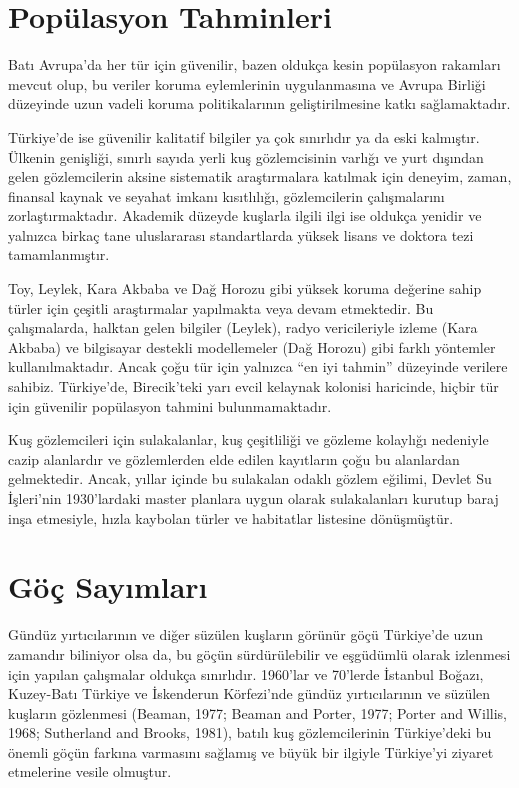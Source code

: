 \documentclass[
  a4paper,
  DIV=11,
  numbers=noendperiod]{scrartcl}
\begin{document}
\section*{Popülasyon Tahminleri}\label{popuxfclasyon-tahminleri}


Batı Avrupa'da her tür için güvenilir, bazen oldukça kesin popülasyon
rakamları mevcut olup, bu veriler koruma eylemlerinin uygulanmasına ve
Avrupa Birliği düzeyinde uzun vadeli koruma politikalarının
geliştirilmesine katkı sağlamaktadır.

Türkiye'de ise güvenilir kalitatif bilgiler ya çok sınırlıdır ya da eski
kalmıştır. Ülkenin genişliği, sınırlı sayıda yerli kuş gözlemcisinin
varlığı ve yurt dışından gelen gözlemcilerin aksine sistematik
araştırmalara katılmak için deneyim, zaman, finansal kaynak ve seyahat
imkanı kısıtlılığı, gözlemcilerin çalışmalarını zorlaştırmaktadır.
Akademik düzeyde kuşlarla ilgili ilgi ise oldukça yenidir ve yalnızca
birkaç tane uluslararası standartlarda yüksek lisans ve doktora tezi
tamamlanmıştır.

Toy, Leylek, Kara Akbaba ve Dağ Horozu gibi yüksek koruma değerine sahip
türler için çeşitli araştırmalar yapılmakta veya devam etmektedir. Bu
çalışmalarda, halktan gelen bilgiler (Leylek), radyo vericileriyle
izleme (Kara Akbaba) ve bilgisayar destekli modellemeler (Dağ Horozu)
gibi farklı yöntemler kullanılmaktadır. Ancak çoğu tür için yalnızca
``en iyi tahmin'' düzeyinde verilere sahibiz. Türkiye'de, Birecik'teki
yarı evcil kelaynak kolonisi haricinde, hiçbir tür için güvenilir
popülasyon tahmini bulunmamaktadır.

Kuş gözlemcileri için sulakalanlar, kuş çeşitliliği ve gözleme kolaylığı
nedeniyle cazip alanlardır ve gözlemlerden elde edilen kayıtların çoğu
bu alanlardan gelmektedir. Ancak, yıllar içinde bu sulakalan odaklı
gözlem eğilimi, Devlet Su İşleri'nin 1930'lardaki master planlara uygun
olarak sulakalanları kurutup baraj inşa etmesiyle, hızla kaybolan türler
ve habitatlar listesine dönüşmüştür.

\section*{Göç Sayımları}\label{guxf6uxe7-sayux131mlarux131}


Gündüz yırtıcılarının ve diğer süzülen kuşların görünür göçü Türkiye'de
uzun zamandır biliniyor olsa da, bu göçün sürdürülebilir ve eşgüdümlü
olarak izlenmesi için yapılan çalışmalar oldukça sınırlıdır. 1960'lar ve
70'lerde İstanbul Boğazı, Kuzey-Batı Türkiye ve İskenderun Körfezi'nde
gündüz yırtıcılarının ve süzülen kuşların gözlenmesi (Beaman, 1977;
Beaman and Porter, 1977; Porter and Willis, 1968; Sutherland and Brooks,
1981), batılı kuş gözlemcilerinin Türkiye'deki bu önemli göçün farkına
varmasını sağlamış ve büyük bir ilgiyle Türkiye'yi ziyaret etmelerine
vesile olmuştur.
\end{document}

